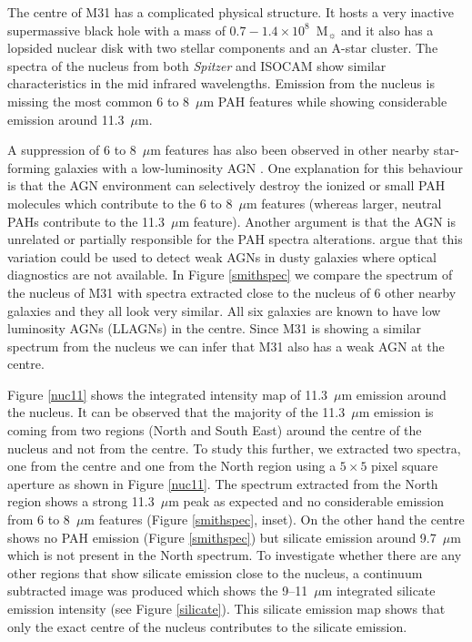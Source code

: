 	
The centre of M31 has a complicated physical structure. It hosts a very inactive supermassive black hole with a mass of 
$0.7-1.4 \times 10^8$~M$_{\sun}$ \citep{Bacon2001} and it also has a lopsided nuclear disk \citep{Lauer1993} with two stellar components and an A-star cluster. 
The spectra of the nucleus from both {\em Spitzer} and ISOCAM show similar characteristics in the mid infrared wavelengths. 
Emission from the nucleus is missing the most common 6 to 8~$\mu$m PAH features while showing considerable emission around 11.3~$\mu$m. 

A suppression of 6 to 8~$\mu$m features has also been observed in other nearby star-forming galaxies with a low-luminosity AGN \citep{Smith:2007lr}. 
One explanation for this behaviour is that the AGN environment can selectively destroy the ionized or small PAH molecules which contribute to the 6 to 8~$\mu$m 
features (whereas larger, neutral PAHs contribute to the 11.3~$\mu$m feature). Another argument is that the AGN is unrelated or partially responsible for the PAH spectra alterations. \citet{Smith:2007lr} argue that this variation could be used to detect weak AGNs in dusty galaxies where optical diagnostics are not available. 
In Figure \ref{smithspec} we compare the spectrum of the nucleus of M31 with spectra extracted close to the nucleus of 6 other nearby galaxies and they 
all look very similar. All six galaxies are known to have low luminosity AGNs (LLAGNs) in the centre. Since M31 is showing a similar spectrum from the 
nucleus we can infer that  M31 also has a weak AGN at the centre.

Figure \ref{nuc11} shows the integrated intensity map of 11.3~$\mu$m emission around the nucleus. It can be observed that the majority of the 11.3~$\mu$m 
emission is coming from two regions (North and South East) around the centre of the nucleus and not from the centre. To study this further, we extracted two 
spectra, one from the centre and one from the North region using a $5 \times 5$ pixel square aperture as shown in Figure \ref{nuc11}. The spectrum extracted 
from the North region shows a strong 11.3~$\mu$m peak as expected and no considerable emission from 6 to 8~$\mu$m features (Figure \ref{smithspec}, inset). 
On the other hand the centre shows no PAH emission (Figure \ref{smithspec}) but silicate emission around 9.7~$\mu$m which is not present in the North spectrum. 
To investigate whether there are any other regions that show silicate emission close to the nucleus, a continuum subtracted image was produced which shows the 
9--11~$\mu$m integrated silicate emission intensity (see Figure \ref{silicate}). This silicate emission map shows that only the exact centre of the nucleus contributes 
to the silicate emission. 

